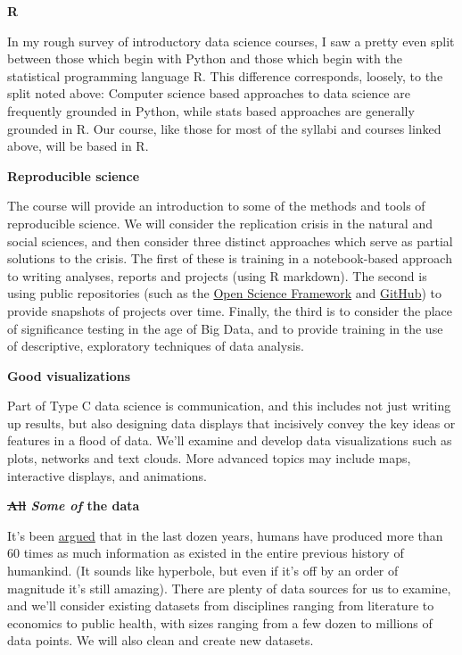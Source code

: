\documentclass[]{book}
\theoremstyle{definition}
\theoremstyle{definition}
\theoremstyle{definition}
\theoremstyle{remark}
\begin{document}
\textbf{R}

In my rough survey of introductory data science courses, I saw a pretty
even split between those which begin with Python and those which begin
with the statistical programming language R. This difference
corresponds, loosely, to the split noted above: Computer science based
approaches to data science are frequently grounded in Python, while
stats based approaches are generally grounded in R. Our course, like
those for most of the syllabi and courses linked above, will be based in
R.

\textbf{Reproducible science}

The course will provide an introduction to some of the methods and tools
of reproducible science. We will consider the replication crisis in the
natural and social sciences, and then consider three distinct approaches
which serve as partial solutions to the crisis. The first of these is
training in a notebook-based approach to writing analyses, reports and
projects (using R markdown). The second is using public repositories
(such as the \href{https://osf.io/}{Open Science Framework} and
\href{https://github.com/}{GitHub}) to provide snapshots of projects
over time. Finally, the third is to consider the place of significance
testing in the age of Big Data, and to provide training in the use of
descriptive, exploratory techniques of data analysis.

\textbf{Good visualizations}

Part of Type C data science is communication, and this includes not just
writing up results, but also designing data displays that incisively
convey the key ideas or features in a flood of data. We'll examine and
develop data visualizations such as plots, networks and text clouds.
More advanced topics may include maps, interactive displays, and
animations.

\textbf{\sout{All} \emph{Some of} the data}

It's been
\href{https://www.udemy.com/datascience/learn/v4/t/lecture/3473822?start=379}{argued}
that in the last dozen years, humans have produced more than 60 times as
much information as existed in the entire previous history of humankind.
(It sounds like hyperbole, but even if it's off by an order of magnitude
it's still amazing). There are plenty of data sources for us to examine,
and we'll consider existing datasets from disciplines ranging from
literature to economics to public health, with sizes ranging from a few
dozen to millions of data points. We will also clean and create new
datasets.
\end{document}

